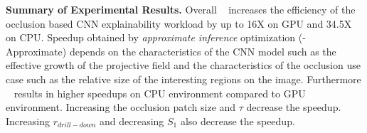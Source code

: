 \vspace{2mm}
\noindent \textbf{Summary of Experimental Results.} Overall \system~ increases the efficiency of the occlusion based CNN explainability workload by up to 16X on GPU and 34.5X on CPU.
Speedup obtained by \textit{approximate inference} optimization (\system-Approximate) depends on the characteristics of the CNN model such as the effective growth of the projective field and the characteristics of the occlusion use case such as the relative size of the interesting regions on the image.
Furthermore \system~ results in higher speedups on CPU environment compared to GPU environment.
Increasing the occlusion patch size and $\tau$ decrease the speedup.
Increasing $r_{drill-down}$ and decreasing $S_1$ also decrease the speedup.

